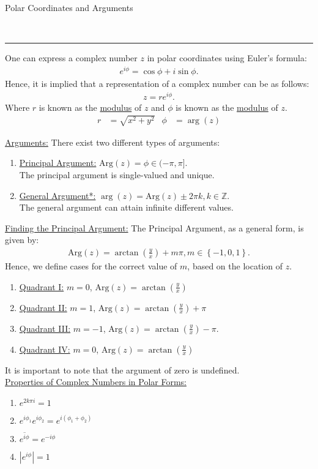 \documentclass{article}
\newcommand{\header}[1]{\begin{large}\noindent #1\end{large}\\\rule{\textwidth}{0.5pt}}
\newcommand{\gap}{\medskip\\}
\newcommand{\sheader}[1]{\underline{#1:}}
\newcommand{\curly}[1]{\left\{#1\right\}}
\begin{document}
    \header{Polar Coordinates and Arguments}

    One can express a complex number $z$ in polar coordinates using Euler's formula:
    \begin{align*}
        e^{i \phi} = \cos \phi + i \sin \phi.
    \end{align*}
    Hence, it is implied that a representation of a complex number can be as follows:
    \begin{align*}
        z = re^{i \phi}.
    \end{align*}
    Where $r$ is known as the \underline{modulus} of $z$ and $\phi$ is known as the 
    \underline{modulus} of $z$. 
    \begin{align*}
        r &= \sqrt{x^2 + y^2} & \phi &= \arg(z)
    \end{align*}

    \sheader{Arguments} There exist two different types of arguments:
    \begin{enumerate}
        \item \sheader{Principal Argument} $\textrm{Arg}(z) = \phi \in (-\pi, \pi]$. \\
        The principal argument is single-valued and unique.
        \item \sheader{General Argument*} $\arg(z) = \textrm{Arg}(z) \pm 2\pi k, k \in \mathbb{Z}$.\\
        The general argument can attain infinite different values.  
    \end{enumerate}
    \sheader{Finding the Principal Argument} The Principal Argument, as a general 
    form, is given by: 
    \begin{align*}
        \textrm{Arg}(z) = \arctan\left(\frac{y}{x}\right) + m\pi, m \in \curly{-1, 0, 1}.
    \end{align*}
    Hence, we define cases for the correct value of $m$, based on the location of $z$.
    \begin{enumerate}
        \item \sheader{Quadrant I} $m = 0$, $\textrm{Arg}(z) = \arctan\left(\frac{y}{x}\right)$
        \item \sheader{Quadrant II} $m = 1$, $\textrm{Arg}(z) = \arctan\left(\frac{y}{x}\right) + \pi$
        \item \sheader{Quadrant III} $m = -1$, $\textrm{Arg}(z) = \arctan\left(\frac{y}{x}\right) - \pi$.
        \item \sheader{Quadrant IV} $m = 0$, $\textrm{Arg}(z) = \arctan\left(\frac{y}{x}\right)$
    \end{enumerate}
    It is important to note that the argument of zero is undefined.
    \gap
    \sheader{Properties of Complex Numbers in Polar Forms}
    \begin{enumerate}
        \item $e^{2k\pi i} = 1$
        \item $e^{i\phi_1} e^{i \phi_2} = e^{i (\phi_1 + \phi_2)}$
        \item $\overline{e^{i\phi}} = e^{-i \phi}$
        \item $|e^{i \phi}| = 1$
    \end{enumerate}
    
\end{document}
